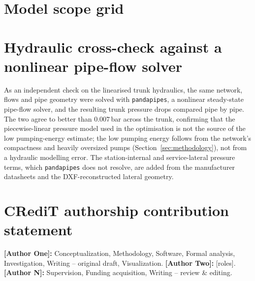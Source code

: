 \documentclass[a4paper,fleqn]{cas-dc}
\begin{document}
\section{Model scope grid}\label{app:scopegrid}


\section{Hydraulic cross-check against a nonlinear pipe-flow solver}\label{app:pandapipes}
As an independent check on the linearised trunk hydraulics, the same network, flows and pipe
geometry were solved with \texttt{pandapipes}, a nonlinear steady-state pipe-flow solver, and
the resulting trunk pressure drops compared pipe by pipe. The two agree to better than
$0.007$\,bar across the trunk, confirming that the piecewise-linear pressure model used in the
optimisation is not the source of the low pumping-energy estimate; the low pumping energy
follows from the network's compactness and heavily oversized pumps (Section~\ref{sec:methodology}),
not from a hydraulic modelling error. The station-internal and service-lateral pressure terms,
which \texttt{pandapipes} does not resolve, are added from the manufacturer datasheets and the
DXF-reconstructed lateral geometry.




\section*{CRediT authorship contribution statement}
\textbf{[Author One]:} Conceptualization, Methodology, Software, Formal analysis, Investigation,
Writing -- original draft, Visualization. \textbf{[Author Two]:} [roles].
\textbf{[Author N]:} Supervision, Funding acquisition, Writing -- review \& editing.


\end{document}
